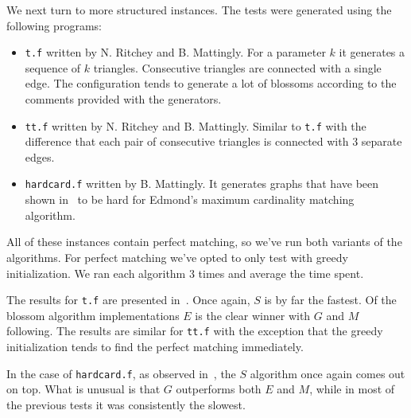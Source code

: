 We next turn to more structured instances. The tests were generated using the following programs:

\begin{itemize}
    \item \texttt{t.f} written by N. Ritchey and B. Mattingly. For a parameter $k$ it generates a sequence of $k$ triangles. Consecutive triangles are connected with a single edge. The configuration tends to generate a lot of blossoms according to the comments provided with the generators.
    \item \texttt{tt.f} written by N. Ritchey and B. Mattingly. Similar to \texttt{t.f} with the difference that each pair of consecutive triangles is connected with $3$ separate edges.
    \item \texttt{hardcard.f} written by B. Mattingly. It generates graphs that have been shown in~\cite{gabow1976efficient} to be hard for Edmond's maximum cardinality matching algorithm.
\end{itemize}

All of these instances contain perfect matching, so we've run both variants of the algorithms. For perfect matching we've opted to only test with greedy initialization. We ran each algorithm $3$ times and average the time spent.

The results for \texttt{t.f} are presented in~. Once again, $S$ is by far the fastest. Of the blossom algorithm implementations $E$ is the clear winner with $G$ and $M$ following. The results are similar for \texttt{tt.f} with the exception that the greedy initialization tends to find the perfect matching immediately. 

In the case of \texttt{hardcard.f}, as observed in~, the $S$ algorithm once again comes out on top. What is unusual is that $G$ outperforms both $E$ and $M$, while in most of the previous tests it was consistently the slowest.

